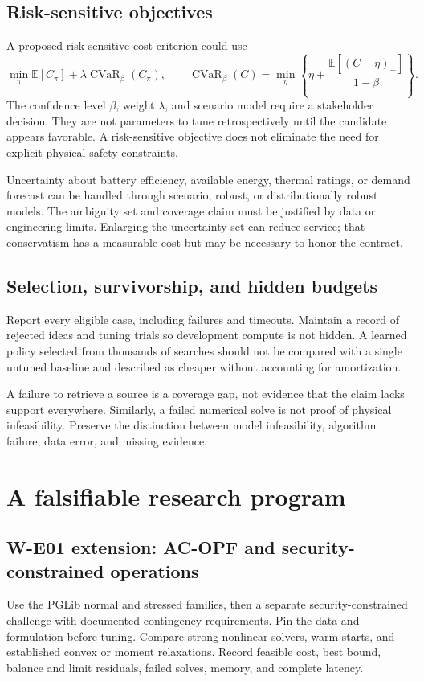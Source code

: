 \documentclass[11pt,letterpaper]{article}
\newcommand{\E}{\mathbb E}\newcommand{\R}{\mathbb R}\newcommand{\CRGC}{\operatorname{CRGC}}
\begin{document}
\subsection{Risk-sensitive objectives}
A proposed risk-sensitive cost criterion could use
\[
 \min_\pi \E[C_\pi]+\lambda\operatorname{CVaR}_\beta(C_\pi),
 \qquad
 \operatorname{CVaR}_\beta(C)=
 \min_\eta\left\{\eta+\frac{\E[(C-\eta)_+]}{1-\beta}\right\}.
\]
The confidence level $\beta$, weight $\lambda$, and scenario model require a stakeholder decision. They are not parameters to tune retrospectively until the candidate appears favorable. A risk-sensitive objective does not eliminate the need for explicit physical safety constraints.

Uncertainty about battery efficiency, available energy, thermal ratings, or demand forecast can be handled through scenario, robust, or distributionally robust models. The ambiguity set and coverage claim must be justified by data or engineering limits. Enlarging the uncertainty set can reduce service; that conservatism has a measurable cost but may be necessary to honor the contract.

\subsection{Selection, survivorship, and hidden budgets}
Report every eligible case, including failures and timeouts. Maintain a record of rejected ideas and tuning trials so development compute is not hidden. A learned policy selected from thousands of searches should not be compared with a single untuned baseline and described as cheaper without accounting for amortization.

A failure to retrieve a source is a coverage gap, not evidence that the claim lacks support everywhere. Similarly, a failed numerical solve is not proof of physical infeasibility. Preserve the distinction between model infeasibility, algorithm failure, data error, and missing evidence.

\section{A falsifiable research program}
\label{sec:program}
\subsection{W-E01 extension: AC-OPF and security-constrained operations}
Use the PGLib normal and stressed families, then a separate security-constrained challenge with documented contingency requirements. Pin the data and formulation before tuning. Compare strong nonlinear solvers, warm starts, and established convex or moment relaxations. Record feasible cost, best bound, balance and limit residuals, failed solves, memory, and complete latency.
\end{document}
